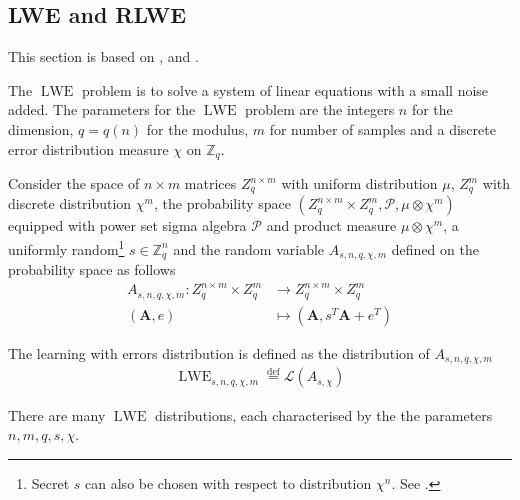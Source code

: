 \subsection*{LWE and RLWE}\label{subsec:LWE}
This section is based on \cite{Hal18}, \cite{LNP22} and \cite{Pei16-decade}.

The $\operatorname{LWE}$ problem is to solve a system of linear equations with a small noise added.
The parameters for the $\operatorname{LWE}$ problem are the integers $n$ for the dimension, $q = q(n)$ for the modulus, $m$ for number of samples and a discrete error distribution measure $\chi$ on $\mathbb{Z}_q$.


Consider the space of $n \times m$ matrices $Z_q^{n \times m}$ with uniform distribution $\mu$, $Z_q^{m}$ with discrete distribution $\chi^m$, the probability space $(Z_q^{n \times m} \times Z_q^m, \mathcal{P}, \mu \otimes \chi^m)$ equipped with power set sigma algebra $\mathcal{P}$ and product measure $\mu \otimes \chi^m$, a uniformly random\footnote{Secret $s$ can also be chosen with respect to distribution $\chi^n$. See \cite{Applebaum}.} $s \in \mathbb{Z}_q^n$ and the random variable $A_{s, n, q, \chi, m}$ defined on the probability space as follows
\begin{equation*}
\begin{aligned}
    A_{s, n, q, \chi, m} \colon Z_q^{n \times m} \times Z_q^m &\to Z_q^{n \times m} \times Z_q^m\\
    (\textbf{A},e) &\mapsto (\textbf{A}, s^T\textbf{A}+e^T) 
\end{aligned}
\end{equation*}
\begin{definition}
    The learning with errors distribution is defined as the distribution of $A_{s, n, q, \chi, m}$
    \begin{equation*}
    \begin{aligned}
        \operatorname{LWE}_{s, n, q, \chi, m} \stackrel{\mathrm{def}}{=} \mathcal{L}(A_{s,\chi})
    \end{aligned}
    \end{equation*}
\end{definition}
\begin{remark}
    There are many $\operatorname{LWE}$ distributions, each characterised by the the parameters $n, m, q, s, \chi$.
\end{remark}

